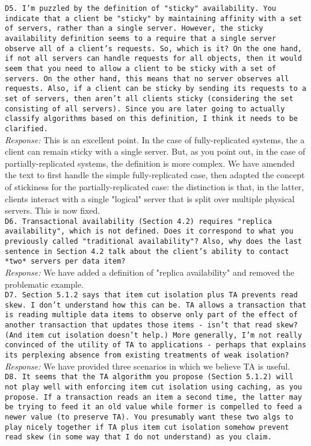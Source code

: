 \documentclass[10pt]{article}
\newcommand{\reviewer}[1] {\noindent\texttt{#1}\\}
\newcommand{\response}[1] {\noindent\textit{Response: } #1\\}
\begin{document}
\reviewer{D5. I'm puzzled by the definition of "sticky" availability. You indicate that a client be "sticky" by maintaining affinity with a set of servers, rather than a single server. However, the sticky availability definition seems to a require that a single server observe all of a client's requests. So, which is it? On the one hand, if not all servers can handle requests for all objects, then it would seem that you need to allow a client to be sticky with a set of servers. On the other hand, this means that no server observes all requests. Also, if a client can be sticky by sending its requests to a set of servers, then aren't all clients sticky (considering the set consisting of all servers). Since you are later going to actually classify algorithms based on this definition, I think it needs to be clarified.}

\response{This is an excellent point. In the case of fully-replicated systems,
the a client can remain sticky with a single server. But, as you point
out, in the case of partially-replicated systems, the definition is
more complex. We have amended the text to first handle the simple
fully-replicated case, then adapted the concept of stickiness for the
partially-replicated case: the distinction is that, in the latter,
clients interact with a single "logical" server that is split over
multiple physical servers. This is now fixed.}

\reviewer{D6. Transactional availability (Section 4.2) requires "replica availability", which is not defined. Does it correspond to what you previously called "traditional availability"? Also, why does the last sentence in Section 4.2 talk about the client's ability to contact *two* servers per data item?}

\response{We have added a definition of "replica availability" and removed the
problematic example.}

\reviewer{D7. Section 5.1.2 says that item cut isolation plus TA prevents read skew. I don't understand how this can be. TA allows a transaction that is reading multiple data items to observe only part of the effect of another transaction that updates those items - isn't that read skew? (And item cut isolation doesn't help.) More generally, I'm not really convinced of the utility of TA to applications - perhaps that explains its perplexing absence from existing treatments of weak isolation? }

\response{We have provided three scenarios in which we believe TA is useful.}

\reviewer{D8. It seems that the TA algorithm you propose (Section 5.1.2) will not play well with enforcing item cut isolation using caching, as you propose. If a transaction reads an item a second time, the latter may be trying to feed it an old value while former is compelled to feed a newer value (to preserve TA). You presumably want these two algs to play nicely together if TA plus item cut isolation somehow prevent read skew (in some way that I do not understand) as you claim. }
\end{document}

